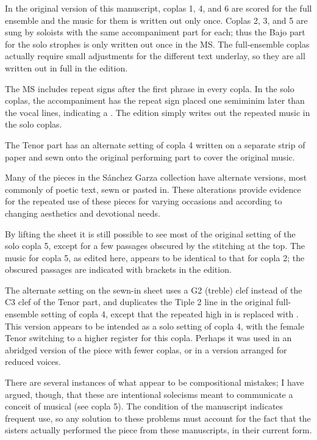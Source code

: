 
In the original version of this manuscript, coplas 1, 4, and 6 are scored for 
the full ensemble and the music for them is written out only once.
Coplas 2, 3, and 5 are sung by soloists with the same accompaniment part for 
each; thus the Bajo part for the solo strophes is only written out once in the 
MS.
The full-ensemble coplas actually require small adjustments for the different 
text underlay, so they are all written out in full in the edition.

The MS includes repeat signs after the first phrase in every copla. 
In the solo coplas, the accompaniment has the repeat sign placed one semiminim 
later than the vocal lines, indicating a .
The edition simply writes out the repeated music in the solo coplas.

The Tenor part has an alternate setting of copla 4 written on a separate strip
of paper and sewn onto the original performing part to cover the original
music.%
  \begin{Footnote}
      Many of the pieces in the Sánchez Garza collection have alternate 
      versions, most commonly of poetic text, sewn or pasted in. 
      These alterations provide evidence for the repeated use of these pieces
      for varying occasions and according to changing aesthetics and devotional
      needs.
  \end{Footnote}
By lifting the sheet it is still possible to see most of the original setting 
of the solo copla 5, except for a few passages obscured by the stitching at the 
top.
The music for copla 5, as edited here, appears to be identical to that for 
copla 2; the obscured passages are indicated with brackets in the edition.

The alternate setting on the sewn-in sheet uses a G2 (treble) clef instead of
the C3 clef of the Tenor part, and duplicates the Tiple 2 line in the original
full-ensemble setting of copla 4, except that the repeated high  in 
 is replaced with .
This version appears to be intended as a solo setting of copla 4, with the 
female Tenor switching to a higher register for this copla. 
Perhaps it was used in an abridged version of the piece with fewer coplas, or 
in a version arranged for reduced voices.



There are several instances of what appear to be compositional mistakes; 
I have argued, though, that these are intentional solecisms meant to communicate
a conceit of musical  (see copla 5).%
    \Autocite[375--403]{Cashner:PhD}
The condition of the manuscript indicates frequent use, so any solution to 
these problems must account for the fact that the sisters actually performed 
the piece from these manuscripts, in their current form.

